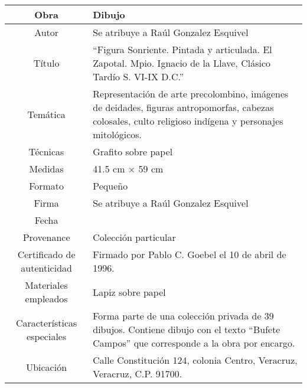 \begin{table}[H]
\centering
\begin{tabular}{|c|m{}|}
\hline
Obra& Dibujo	\\
\hline
Autor & Se atribuye a Ra\'ul Gonzalez Esquivel\\
\hline
T\'itulo & ``Figura Sonriente. Pintada y articulada. El Zapotal. Mpio. Ignacio de la Llave, Cl\'asico Tard\'io S. VI-IX D.C.''\\
\hline
Tem\'atica & Representaci\'on de arte precolombino, im\'agenes de deidades, figuras antropomorfas, cabezas colosales, culto religioso ind\'igena y personajes mitol\'ogicos.\\
\hline
T\'ecnicas &Grafito sobre papel \\
\hline
Medidas & 41.5 cm $\times$ 59 cm \\
\hline
 Formato & Peque\~no \\
 \hline
 Firma & Se atribuye a Ra\'ul Gonzalez Esquivel\\ 
 \hline
  Fecha & \\
 \hline
 Provenance & Colecci\'on particular\\
 \hline
 Certificado de autenticidad& Firmado por Pablo C. Goebel el 10 de abril de 1996.  \\
 \hline 
  Materiales empleados & Lapiz sobre papel\\
 \hline
 Caracter\'isticas especiales & Forma parte de una colecci\'on privada de 39 dibujos. 
Contiene dibujo con el texto ``Bufete Campos'' que corresponde a la obra por encargo. \\
\hline 
Ubicaci\'on & Calle Constituci\'on 124, colonia Centro, Veracruz, Veracruz, C.P. 91700.\\
\hline

\end{tabular}
\end{table}

